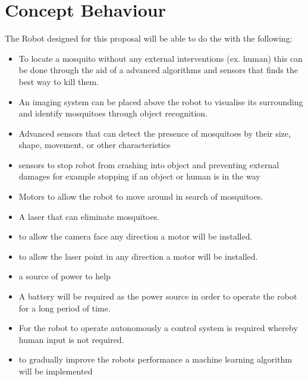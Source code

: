 \documentclass[11pt]{article}
\begin{document}
	\section{Concept Behaviour}
	The Robot designed for this proposal will be able to do the with the following:
	\begin{itemize}
		\item To locate a mosquito without any external interventions (ex. human) this can be done through the aid of a advanced algorithms and sensors that finds the best way to kill them. 
		\item An imaging system can be placed above the robot to visualise its surrounding and identify mosquitoes through object recognition.
		\item Advanced sensors that can detect the presence of mosquitoes by their size, shape, movement, or other characteristics
		\item sensors to  stop robot from crashing into object and preventing external damages for example stopping if an object or human is in the way 
		\item Motors to allow the robot to move around in search of mosquitoes.
		\item A laser that can eliminate mosquitoes.
		\item to allow the camera face any direction a motor will be installed.
		\item to allow the laser point in any direction a motor will be installed.
		\item a source of power to help 
		\item A battery will be required as the power source in order to operate the robot for a long period of time.
		\item For the robot to operate autonomously a control system is required whereby human input is not required.
		\item to gradually improve the robots performance a machine learning algorithm will be implemented
		
	\end{itemize}
\end{document}
